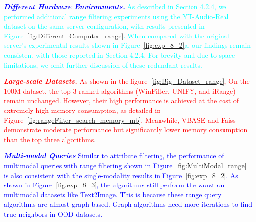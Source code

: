 \documentclass[sigconf, nonacm]{acmart}
\begin{document}
	\textit{\textbf{\textcolor{blue}{Different Hardware Environments.}}}
	\textcolor{cyan}{As described in Section 4.2.4, we performed additional range filtering experiments using the YT-Audio-Real dataset on the same server configuration, with results presented in Figure~\ref{fig:Different_Computer_range}. When compared with the original server's experimental results shown in Figure~\ref{fig:exp_8_2}a, our findings remain consistent with those reported in Section 4.2.4. For brevity and due to space limitations, we omit further discussion of these redundant results.}
	
	\textit{\textbf{\textcolor{red}{Large-scale Datasets.}}} \textcolor{red}{As shown in the figure~\ref{fig:Big_Dataset_range}, On the 100M dataset, the top 3 ranked algorithms (WinFilter, UNIFY, and iRange) remain unchanged. However, their high performance is achieved at the cost of extremely high memory consumption, as detailed in Figure~\ref{fig:rangeFilter_search_memory_mb}. Meanwhile, VBASE and Faiss demonstrate moderate performance but significantly lower memory consumption than the top three algorithms}.
	
	\textit{\textbf{\textcolor{blue}{Multi-modal Queries}}}
	\textcolor{blue}{
	Similar to attribute filtering, the performance of multimodal queries with range filtering shown in Figure~\ref{fig:MultiModal_range} is also consistent with the single-modality results in Figure~\ref{fig:exp_8_2}. As shown in Figure~\ref{fig:exp_8_3}, the algorithms still perform the worst on multimodal datasets like Text2Image. This is because these range query algorithms are almost graph-based. Graph algorithms need more iterations to find true neighbors in OOD datasets.}
	
	
\end{document}
